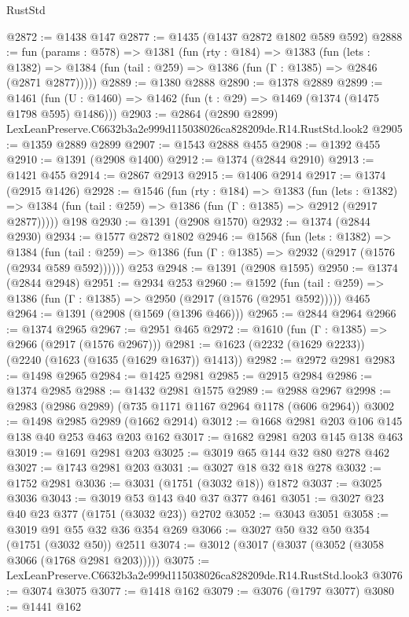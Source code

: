 \begin{lexlean}{RustStd}
\begin{coremodule}
@2872 := @1438 @147
@2877 := @1435 (@1437 @2872 @1802 @589 @592)
@2888 := fun (params : @578) =>
  @1381
    (fun (rty : @184) =>
    @1383
      (fun (lets : @1382) =>
      @1384 (fun (tail : @259) => @1386 (fun (Γ : @1385) => @2846 (@2871 @2877)))))
@2889 := @1380 @2888
@2890 := @1378 @2889
@2899 := @1461 (fun (U : @1460) => @1462 (fun (t : @29) => @1469 (@1374 (@1475 @1798 @595) @1486)))
@2903 := @2864 (@2890 @2899) LexLeanPreserve.C6632b3a2e999d115038026ca828209de.R14.RustStd.look2
@2905 := @1359 @2889 @2899
@2907 := @1543 @2888 @455
@2908 := @1392 @455
@2910 := @1391 (@2908 @1400)
@2912 := @1374 (@2844 @2910)
@2913 := @1421 @455
@2914 := @2867 @2913
@2915 := @1406 @2914
@2917 := @1374 (@2915 @1426)
@2928 := @1546
    (fun (rty : @184) =>
    @1383
      (fun (lets : @1382) =>
      @1384 (fun (tail : @259) => @1386 (fun (Γ : @1385) => @2912 (@2917 @2877)))))
    @198
@2930 := @1391 (@2908 @1570)
@2932 := @1374 (@2844 @2930)
@2934 := @1577 @2872 @1802
@2946 := @1568
    (fun (lets : @1382) =>
    @1384 (fun (tail : @259) => @1386 (fun (Γ : @1385) => @2932 (@2917 (@1576 (@2934 @589 @592))))))
    @253
@2948 := @1391 (@2908 @1595)
@2950 := @1374 (@2844 @2948)
@2951 := @2934 @253
@2960 := @1592
    (fun (tail : @259) => @1386 (fun (Γ : @1385) => @2950 (@2917 (@1576 (@2951 @592)))))
    @465
@2964 := @1391 (@2908 (@1569 (@1396 @466)))
@2965 := @2844 @2964
@2966 := @1374 @2965
@2967 := @2951 @465
@2972 := @1610 (fun (Γ : @1385) => @2966 (@2917 (@1576 @2967)))
@2981 := @1623 (@2232 (@1629 @2233)) (@2240 (@1623 (@1635 (@1629 @1637)) @1413))
@2982 := @2972 @2981
@2983 := @1498 @2965
@2984 := @1425 @2981
@2985 := @2915 @2984
@2986 := @1374 @2985
@2988 := @1432 @2981 @1575
@2989 := @2988 @2967
@2998 := @2983 (@2986 @2989) (@735 @1171 @1167 @2964 @1178 (@606 @2964))
@3002 := @1498 @2985 @2989 (@1662 @2914)
@3012 := @1668 @2981 @203 @106 @145 @138 @40 @253 @463 @203 @162
@3017 := @1682 @2981 @203 @145 @138 @463
@3019 := @1691 @2981 @203
@3025 := @3019 @65 @144 @32 @80 @278 @462
@3027 := @1743 @2981 @203
@3031 := @3027 @18 @32 @18 @278
@3032 := @1752 @2981
@3036 := @3031 (@1751 (@3032 @18)) @1872
@3037 := @3025 @3036
@3043 := @3019 @53 @143 @40 @37 @377 @461
@3051 := @3027 @23 @40 @23 @377 (@1751 (@3032 @23)) @2702
@3052 := @3043 @3051
@3058 := @3019 @91 @55 @32 @36 @354 @269
@3066 := @3027 @50 @32 @50 @354 (@1751 (@3032 @50)) @2511
@3074 := @3012 (@3017 (@3037 (@3052 (@3058 @3066 (@1768 @2981 @203)))))
@3075 := LexLeanPreserve.C6632b3a2e999d115038026ca828209de.R14.RustStd.look3
@3076 := @3074 @3075
@3077 := @1418 @162
@3079 := @3076 (@1797 @3077)
@3080 := @1441 @162

\end{coremodule}
\end{lexlean}
